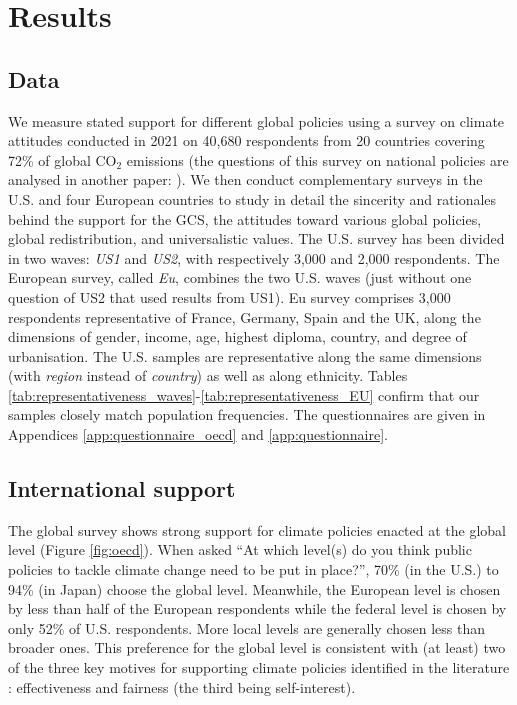 \section{Results}
\subsection{Data}
We measure stated support for different global policies using %
a survey on climate attitudes conducted in 2021 on 40,680 respondents from 20 countries covering 72\% of global CO$_\text{2}$ emissions (the questions of this survey on national policies are analysed in another paper: \citealp{dechezlepretre_fighting_2022}). We then conduct complementary surveys in the U.S. and four European countries to study in detail the sincerity and rationales behind the support for the GCS, the attitudes toward various global policies, global redistribution, and universalistic values. The U.S. survey has been divided in two waves: \textit{US1} and \textit{US2}, with respectively 3,000 and 2,000 respondents. The European survey, called \textit{Eu}, combines the two U.S. waves (just without one question of US2 that used results from US1). Eu survey comprises 3,000 respondents representative of France, Germany, Spain and the UK, along the dimensions of gender, income, age, highest diploma, country, and degree of urbanisation. The U.S. samples are representative along the same dimensions (with \textit{region} instead of \textit{country}) as well as along ethnicity. Tables \ref{tab:representativeness_waves}-\ref{tab:representativeness_EU} confirm that our samples closely match population frequencies. The questionnaires are given in Appendices \ref{app:questionnaire_oecd} and \ref{app:questionnaire}.

\subsection{International support}
The global survey shows strong support for climate policies enacted at the global level (Figure \ref{fig:oecd}). When asked ``At which level(s) do you think public policies to tackle climate change need to be put in place?'', 70\% (in the U.S.) to 94\% (in Japan) choose the global level. Meanwhile, the European level is chosen by less than half of the European respondents while the federal level is chosen by only 52\% of U.S. respondents. More local levels are generally chosen less than broader ones. This preference for the global level is consistent with (at least) two of the three key motives for supporting climate policies identified in the literature %
\citep{klenert_making_2018,douenne_yellow_2022,dechezlepretre_fighting_2022}: effectiveness and fairness (the third being self-interest). %

